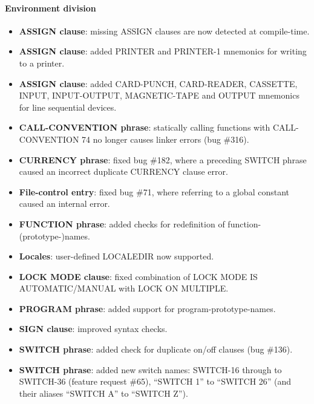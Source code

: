 \paragraph{Environment division}
\begin{itemize}
\item \textbf{ASSIGN clause}: missing ASSIGN clauses are now detected at compile-time.
\item \textbf{ASSIGN clause}: added PRINTER and PRINTER-1 mnemonics for writing to a printer.
\item \textbf{ASSIGN clause}: added CARD-PUNCH, CARD-READER, CASSETTE, INPUT, INPUT-OUTPUT, MAGNETIC-TAPE and OUTPUT mnemonics for line sequential devices.
\item \textbf{CALL-CONVENTION phrase}: statically calling functions with CALL-CONVENTION 74 no longer causes linker errors (bug \#316).
\item \textbf{CURRENCY phrase}: fixed bug \#182, where a preceding SWITCH phrase caused an incorrect duplicate CURRENCY clause error.
\item \textbf{File-control entry}: fixed bug \#71, where referring to a global constant caused an internal error.
\item \textbf{FUNCTION phrase}: added checks for redefinition of function-(prototype-)names.
\item \textbf{Locales}: user-defined LOCALEDIR now supported.
\item \textbf{LOCK MODE clause}: fixed combination of LOCK MODE IS AUTOMATIC/MANUAL with LOCK ON MULTIPLE.
\item \textbf{PROGRAM phrase}: added support for program-prototype-names.
\item \textbf{SIGN clause}: improved syntax checks.
\item \textbf{SWITCH phrase}: added check for duplicate on\slash{}off clauses (bug \#136).
\item \textbf{SWITCH phrase}: added new switch names: SWITCH-16 through to SWITCH-36 (feature request \#65), ``SWITCH 1'' to ``SWITCH 26'' (and their aliases  ``SWITCH A'' to ``SWITCH Z'').
\end{itemize}


